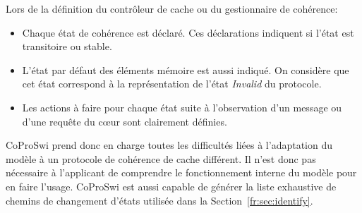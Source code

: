 Lors de la définition du contrôleur de cache ou du gestionnaire de cohérence:
\begin{itemize}
    \setlength{\itemsep}{0pt}%
   \setlength{\parskip}{0pt}%
\item
   Chaque état de cohérence est déclaré. Ces déclarations indiquent si l'état
   est transitoire ou stable.%
\item
   L'état par défaut des éléments mémoire est aussi indiqué. On considère que cet
   état correspond à la représentation de l'état \textit{Invalid} du protocole.
\item
   Les actions à faire pour chaque état suite à l'observation d'un message ou
   d'une requête du cœur sont clairement définies.
\end{itemize}

CoProSwi prend donc en charge toutes les difficultés liées à l'adaptation du
modèle à un protocole de cohérence de cache différent. Il n'est donc pas
nécessaire à l'applicant de comprendre le fonctionnement interne du modèle pour
en faire l'usage. CoProSwi est aussi capable de générer la liste exhaustive
de chemins de changement d'états utilisée dans la Section~\ref{fr:sec:identify}.
